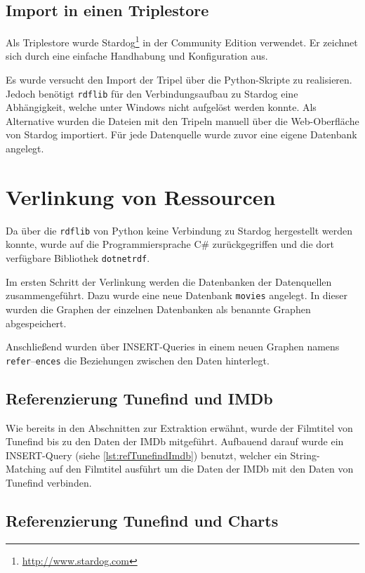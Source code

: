 \documentclass[parskip]{scrartcl}
\begin{document}
\subsection{Import in einen Triplestore}

Als Triplestore wurde Stardog\footnote{\url{http://www.stardog.com}} in der Community Edition verwendet. Er zeichnet sich durch eine einfache Handhabung und Konfiguration aus.

Es wurde versucht den Import der Tripel über die Python-Skripte zu realisieren. Jedoch benötigt \texttt{rdflib} für den Verbindungsaufbau zu Stardog eine Abhängigkeit, welche unter Windows nicht aufgelöst werden konnte. Als Alternative wurden die Dateien mit den Tripeln manuell über die Web-Oberfläche von Stardog importiert. Für jede Datenquelle wurde zuvor eine eigene Datenbank angelegt.

\section{Verlinkung von Ressourcen}

Da über die \texttt{rdflib} von Python keine Verbindung zu Stardog hergestellt werden konnte, wurde auf die Programmiersprache C\# zurückgegriffen und die dort verfügbare Bibliothek \texttt{dotnetrdf}.

Im ersten Schritt der Verlinkung werden die Datenbanken der Datenquellen zusammengeführt. Dazu wurde eine neue Datenbank \texttt{movies} angelegt. In dieser wurden die Graphen der einzelnen Datenbanken als benannte Graphen abgespeichert.

Anschließend wurden über INSERT-Queries in einem neuen Graphen namens \texttt{refer}--\texttt{ences} die Beziehungen zwischen den Daten hinterlegt.

\subsection{Referenzierung Tunefind und IMDb}
\label{subsec:refTunefindImdb}

Wie bereits in den Abschnitten zur Extraktion erwähnt, wurde der Filmtitel von Tunefind bis zu den Daten der IMDb mitgeführt. Aufbauend darauf wurde ein INSERT-Query (siehe \autoref{lst:refTunefindImdb}) benutzt, welcher ein String-Matching auf den Filmtitel ausführt um die Daten der IMDb mit den Daten von Tunefind verbinden.

\subsection{Referenzierung Tunefind und Charts}
\end{document}
